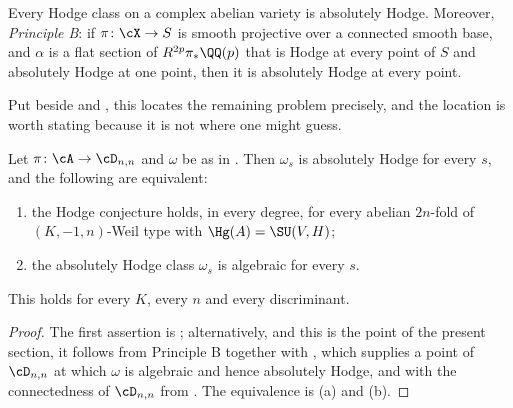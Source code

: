 \begin{theorem}\label{thm:deligneAH}
Every Hodge class on a complex abelian variety is absolutely Hodge. Moreover,
\emph{Principle B}: if $\pi\colon\cX\to S$ is smooth projective over a
connected smooth base, and $\alpha$ is a flat section of $R^{2p}\pi_{*}\QQ(p)$
that is Hodge at every point of $S$ and absolutely Hodge at one point, then it
is absolutely Hodge at every point.
\end{theorem}

Put beside  and , this locates the
remaining problem precisely, and the location is worth stating because it is
not where one might guess.

\begin{corollary}\label{cor:exactform}
Let $\pi\colon\cA\to\cD_{n,n}$ and $\omega$ be as in . Then
$\omega_{s}$ is absolutely Hodge for every $s$, and the following are
equivalent:
\begin{enumerate}[label=\textup{(\roman*)},nosep]
\item the Hodge conjecture holds, in every degree, for every abelian
  $2n$-fold of $(K,-1,n)$-Weil type with $\Hg(A)=\SU(V,H)$;
\item the absolutely Hodge class $\omega_{s}$ is algebraic for every $s$.
\end{enumerate}
This holds for every $K$, every $n$ and every discriminant.
\end{corollary}

\begin{proof}
The first assertion is ; alternatively, and this is the
point of the present section, it follows from Principle B together with
, which supplies a point of $\cD_{n,n}$ at which
$\omega$ is algebraic and hence absolutely Hodge, and with the connectedness of
$\cD_{n,n}$ from . The equivalence is
(a) and (b).
\end{proof}


